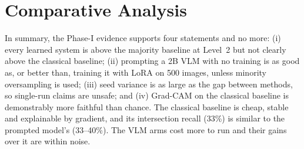 \section{Comparative Analysis}

In summary, the Phase-I evidence supports four statements and no more:
(i) every learned system is above the majority baseline at Level~2 but not clearly above the classical baseline;
(ii) prompting a 2B VLM with no training is as good as, or better than, training it with LoRA on 500 images, unless minority oversampling is used;
(iii) seed variance is as large as the gap between methods, so single-run claims are unsafe; and
(iv) Grad-CAM on the classical baseline is demonstrably more faithful than chance.
The classical baseline is cheap, stable and explainable by gradient, and its intersection recall (33\%) is similar to the prompted model's (33--40\%). The VLM arms cost more to run and their gains over it are within noise.
